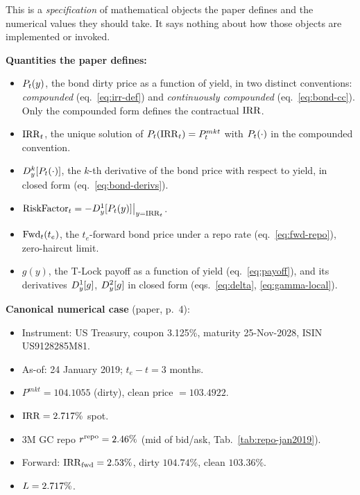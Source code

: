 \documentclass[11pt,a4paper]{article}
\begin{document}
\begin{validation}
This is a \emph{specification} of mathematical objects the paper
defines and the numerical values they should take. It says nothing
about how those objects are implemented or invoked.

\textbf{Quantities the paper defines:}
\begin{itemize}[noitemsep]
  \item $P_{t}(y)$, the bond dirty price as a function of yield, in
        two distinct conventions:
        \emph{compounded} (eq.~\ref{eq:irr-def}) and
        \emph{continuously compounded} (eq.~\ref{eq:bond-cc}).
        Only the compounded form defines the contractual $\mathrm{IRR}$.
  \item $\mathrm{IRR}_t$, the unique solution of $P_{t}(\mathrm{IRR}_t) = P^{mkt}_t$
        with $P_{t}(\cdot)$ in the compounded convention.
  \item $D_{y}^{k}[P_{t}(\cdot)]$, the $k$-th derivative of the
        bond price with respect to yield, in closed form
        (eq.~\ref{eq:bond-derivs}).
  \item $\mathrm{RiskFactor}_t = -D_{y}^{1}[P_{t}(y)]\big|_{y=\mathrm{IRR}_t}$.
  \item $\mathrm{Fwd}_{t}(t_e)$, the $t_e$-forward bond price under a repo
        rate (eq.~\ref{eq:fwd-repo}), zero-haircut limit.
  \item $g(y)$, the T-Lock payoff as a function of yield
        (eq.~\ref{eq:payoff}), and its derivatives
        $D_{y}^{1}[g]$, $D_{y}^{2}[g]$ in closed form
        (eqs.~\ref{eq:delta}, \ref{eq:gamma-local}).
\end{itemize}

\textbf{Canonical numerical case} (paper, p.~4):
\begin{itemize}[noitemsep]
  \item Instrument: US Treasury, coupon 3.125\%, maturity 25-Nov-2028, ISIN US9128285M81.
  \item As-of: 24 January 2019; $t_e - t = 3$ months.
  \item $P^{mkt} = 104.1055$ (dirty), clean price $= 103.4922$.
  \item $\mathrm{IRR} = 2.717\%$ spot.
  \item 3M GC repo $r^{\mathrm{repo}} = 2.46\%$ (mid of bid/ask, Tab.~\ref{tab:repo-jan2019}).
  \item Forward: $\mathrm{IRR}_{\mathrm{fwd}} = 2.53\%$, dirty $104.74\%$, clean $103.36\%$.
  \item $L = 2.717\%$.
\end{itemize}


\end{validation}
\end{document}
